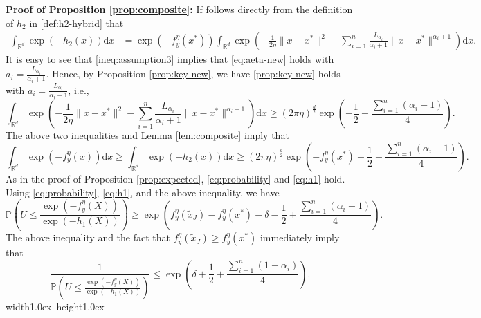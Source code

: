 \documentclass[11pt,letterpaper]{article}
\newcommand*{\QEDA}{\hfill\hbox{\vrule width1.0ex height1.0ex}}
\newcommand{\R}{\mathbb{R}}
\newcommand{\tx}{\tilde x}
\newcommand{\rd}{\mathrm{d}}
\begin{document}
\noindent
{\bf Proof of Proposition \ref{prop:composite}:}
If follows directly from the definition of $h_2$ in \eqref{def:h2-hybrid} that 
\begin{align*}
    \int_{\R^d} \exp(-h_2(x)) \rd x &= \exp(-f_y^\eta(x^*)) \int_{\R^d} \exp\left(-\frac{1}{2\eta} \|x-x^*\|^2 - \sum_{i=1}^n \frac{L_{\alpha_i}}{\alpha_i+1} \|x-x^*\|^{\alpha_i+1}\right) \rd x.
\end{align*}
It is easy to see that \eqref{ineq:assumption3} implies that \eqref{eq:aeta-new} holds with $a_i=\frac{L_{\alpha_i}}{\alpha_i+1}$. Hence, by Proposition \ref{prop:key-new}, we have \eqref{prop:key-new} holds with $a_i=\frac{L_{\alpha_i}}{\alpha_i+1}$, i.e.,
\[
\int_{\R^d} \exp\left(-\frac{1}{2\eta} \|x-x^*\|^2 - \sum_{i=1}^n \frac{L_{\alpha_i}}{\alpha_i+1} \|x-x^*\|^{\alpha_i+1}\right) \rd x \ge (2\pi \eta )^{\frac d2} \exp \left( -\frac12 + \frac{\sum_{i=1}^n (\alpha_i-1)}{4}\right).
\]
The above two inequalities and Lemma \ref{lem:composite} imply that
\[
\int_{\R^d} \exp(-f_y^\eta(x)) \rd x \ge
\int_{\R^d} \exp(-h_2(x)) \rd x \ge (2\pi \eta )^{\frac d2} \exp \left( -f_y^\eta(x^*)-\frac12 + \frac{\sum_{i=1}^n (\alpha_i-1)}{4}\right).
\]
As in the proof of Proposition \ref{prop:expected}, \eqref{eq:probability} and \eqref{eq:h1} hold.
Using \eqref{eq:probability}, \eqref{eq:h1}, and the above inequality, we have
\[
\mathbb{P}\left(U \leq \frac{\exp(-f_y^\eta(X))}{\exp(-h_1(X))}\right) 
\ge \exp\left(f_y^\eta(\tx_J) - f_y^\eta(x^*) - \delta -\frac12 + \frac{\sum_{i=1}^n (\alpha_i-1)}{4}\right).
\]
 The above inequality and the fact that $f_y^\eta(\tx_J) \ge f_y^\eta(x^*)$ immediately imply that
\[
\frac{1}{\mathbb{P}\left(U \leq \frac{\exp(-f_y^\eta(X))}{\exp(-h_1(X))}\right) }
\le \exp\left(\delta +\frac12 + \frac{\sum_{i=1}^n (1-\alpha_i)}{4}\right).
\]
\QEDA


\end{document}
